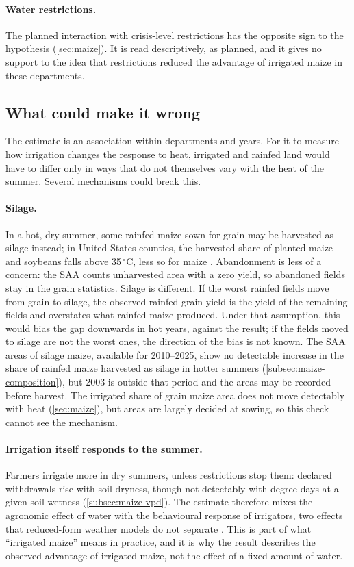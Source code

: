 \paragraph{Water restrictions.} The planned interaction with crisis-level restrictions has the opposite sign to the hypothesis (\cref{sec:maize}). It is read descriptively, as planned, and it gives no support to the idea that restrictions reduced the advantage of irrigated maize in these departments.

\subsection{What could make it wrong}
\label{subsec:discussion-wrong}

The estimate is an association within departments and years. For it to measure how irrigation changes the response to heat, irrigated and rainfed land would have to differ only in ways that do not themselves vary with the heat of the summer. Several mechanisms could break this.

\paragraph{Silage.} In a hot, dry summer, some rainfed maize sown for grain may be harvested as silage instead; in United States counties, the harvested share of planted maize and soybeans falls above 35\,$^{\circ}$C, less so for maize \parencite{cui2020}. Abandonment is less of a concern: the SAA counts unharvested area with a zero yield, so abandoned fields stay in the grain statistics. Silage is different. If the worst rainfed fields move from grain to silage, the observed rainfed grain yield is the yield of the remaining fields and overstates what rainfed maize produced. Under that assumption, this would bias the gap downwards in hot years, against the result; if the fields moved to silage are not the worst ones, the direction of the bias is not known. The SAA areas of silage maize, available for 2010--2025, show no detectable increase in the share of rainfed maize harvested as silage in hotter summers (\cref{subsec:maize-composition}), but 2003 is outside that period and the areas may be recorded before harvest. The irrigated share of grain maize area does not move detectably with heat (\cref{sec:maize}), but areas are largely decided at sowing, so this check cannot see the mechanism.

\paragraph{Irrigation itself responds to the summer.} Farmers irrigate more in dry summers, unless restrictions stop them: declared withdrawals rise with soil dryness, though not detectably with degree-days at a given soil wetness (\cref{subsec:maize-vpd}). The estimate therefore mixes the agronomic effect of water with the behavioural response of irrigators, two effects that reduced-form weather models do not separate \parencite{bareille2024}. This is part of what ``irrigated maize'' means in practice, and it is why the result describes the observed advantage of irrigated maize, not the effect of a fixed amount of water.

